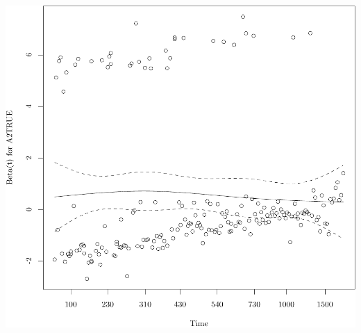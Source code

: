 \documentclass{article}\usepackage[]{graphicx}\usepackage[]{color}
\makeatletter
\def\maxwidth{ %
  \ifdim\Gin@nat@width>\linewidth
    \linewidth
  \else
    \Gin@nat@width
  \fi
}
\newenvironment{knitrout}{}{} %
\makeatother
\begin{document}
\begin{knitrout}
{\centering \includegraphics[width=\maxwidth]{figure/05-eda-final-fit-2} 

}



\end{knitrout}
\end{document}
